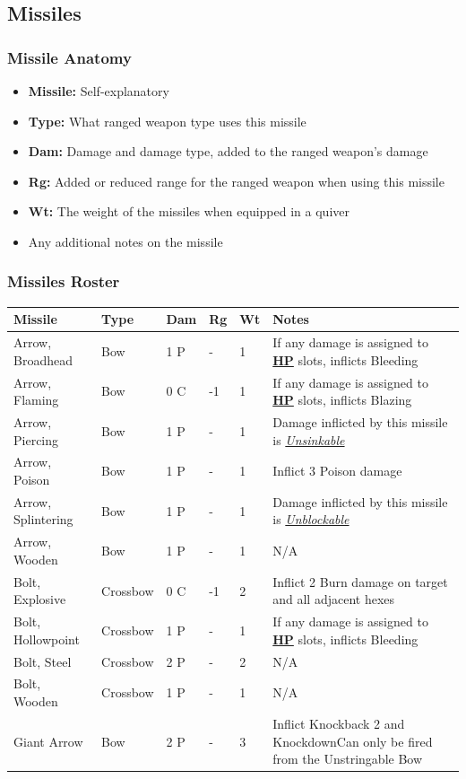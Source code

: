 \documentclass[12pt]{article}
\newcommand{\refto}[1]{\hyperlink{#1}{\textbf{#1}}}
\newcommand{\reftoit}[1]{\hyperlink{#1}{\emph{#1}}}
\begin{document}
\pagebreak

\subsection{Missiles}
\subsubsection*{Missile Anatomy}
\begin{itemize}
\item \textbf{Missile:} Self-explanatory
\item \textbf{Type:} What ranged weapon type uses this missile
\item \textbf{Dam:} Damage and damage type, added to the ranged weapon’s damage
\item \textbf{Rg:} Added or reduced range for the ranged weapon when using this missile
\item \textbf{Wt:} The weight of the missiles when equipped in a quiver
\item Any additional notes on the missile
\end{itemize}

\subsubsection*{Missiles Roster}
\begin{center}
\begin{tabularx}{\textwidth}{p{}p{}p{}p{}p{}p{}}
\hline
\rowcolor{white} \textbf{Missile} & \textbf{Type} & \textbf{Dam} & \textbf{Rg} & \textbf{Wt} & \textbf{Notes}\\
\hline
Arrow, Broadhead  & Bow & 1 P & - & 1 & If any damage is assigned to \refto{HP} slots, inflicts Bleeding\\
Arrow, Flaming & Bow & 0 C & -1 & 1 & If any damage is assigned to \refto{HP} slots, inflicts Blazing\\
Arrow, Piercing & Bow & 1 P & - & 1 & Damage inflicted by this missile is \reftoit{Unsinkable}\\
Arrow, Poison & Bow & 1 P &  - & 1 & Inflict 3 Poison damage\\
Arrow, Splintering & Bow & 1 P & - & 1 & Damage inflicted by this missile is \reftoit{Unblockable}\\
Arrow, Wooden & Bow & 1 P & - & 1 & N/A\\
Bolt, Explosive & Crossbow & 0 C & -1 & 2 & Inflict 2 Burn damage on target and all adjacent hexes\\
Bolt, Hollowpoint & Crossbow & 1 P &  - & 1 & If any damage is assigned to \refto{HP} slots, inflicts Bleeding\\
Bolt, Steel & Crossbow & 2 P &  - & 2 & N/A\\
Bolt, Wooden & Crossbow & 1 P & - & 1 & N/A\\
Giant Arrow & Bow & 2 P &  - & 3 & Inflict Knockback 2 and Knockdown\newline Can only be fired from the Unstringable Bow\\
\hline
\end{tabularx}
\end{center}
\end{document}
